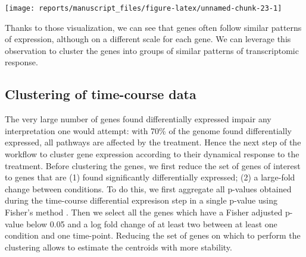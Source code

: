 \documentclass[9pt,a4paper,]{extarticle}
\newenvironment{Shaded}{\begin{snugshade}}{\end{snugshade}}
\newcommand{\DataTypeTok}[1]{\textcolor[rgb]{0.13,0.29,0.53}{#1}}
\newcommand{\DecValTok}[1]{\textcolor[rgb]{0.00,0.00,0.81}{#1}}
\newcommand{\FloatTok}[1]{\textcolor[rgb]{0.00,0.00,0.81}{#1}}
\newcommand{\KeywordTok}[1]{\textcolor[rgb]{0.13,0.29,0.53}{\textbf{#1}}}
\newcommand{\NormalTok}[1]{#1}
\newcommand{\OperatorTok}[1]{\textcolor[rgb]{0.81,0.36,0.00}{\textbf{#1}}}
\newcommand{\OtherTok}[1]{\textcolor[rgb]{0.56,0.35,0.01}{#1}}
\newcommand{\StringTok}[1]{\textcolor[rgb]{0.31,0.60,0.02}{#1}}
\begin{document}
\begin{Shaded}
\end{Shaded}

\begin{center}\texttt{[image: reports/manuscript\_files/figure-latex/unnamed-chunk-23-1]} \end{center}

Thanks to those visualization, we can see that genes often follow similar
patterns of expression, although on a different scale for each gene. We can
leverage this observation to cluster the genes into groups of similar patterns
of transcriptomic response.

\hypertarget{clustering-of-time-course-data}{%
\subsection{Clustering of time-course data}\label{clustering-of-time-course-data}}

The very large number of genes found differentially expressed impair any
interpretation one would attempt: with 70\% of the genome found differentially
expressed, all pathways are affected by the treatment. Hence the next step of
the workflow to cluster gene expression according to their dynamical response
to the treatment. Before clustering the genes, we first reduce the set of
genes of interest to genes that are (1) found significantly differentially
expressed; (2) a large-fold change between conditions. To do this, we first
aggregate all p-values obtained during the time-course differential expresison
step in a single p-value using Fisher's method \citep{fisher:statistical}. Then we
select all the genes which have a Fisher adjusted p-value below 0.05 and a log
fold change of at least two between at least one condition and one time-point.
Reducing the set of genes on which to perform the clustering allows to
estimate the centroids with more stability.
\end{document}
